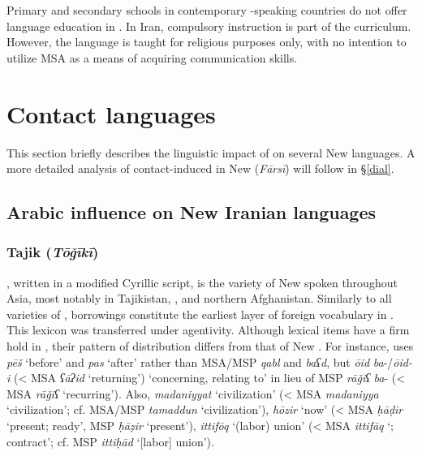\documentclass[output=paper]{langsci/langscibook}
\begin{document}
Primary and secondary schools in contemporary -speaking countries do not offer language education in . In Iran, compulsory   instruction is part of the curriculum. However, the language is taught for religious purposes only, with no intention to utilize MSA as a means of acquiring communication skills.

\section{Contact languages}

This section briefly describes the linguistic impact of   on several New  languages. A more detailed analysis of contact-induced  in New  (\textit{Fārsī}) will follow in §\ref{dial}.

\subsection{Arabic influence on New Iranian languages}

\subsubsection{Tajik (\textit{Tōǧīkī})}

, written in a modified Cyrillic script, is the variety of New  spoken throughout  Asia, most notably in Tajikistan, , and northern Afghanistan. Similarly to all varieties of ,  borrowings constitute the earliest layer of foreign vocabulary in  \citep{Perry2009}. This lexicon was transferred under  agentivity. Although  lexical items have a firm hold in , their pattern of distribution differs from that of New . For instance,  uses \textit{pēš} ‘before’ and \textit{pas} ‘after’ rather than MSA/MSP \textit{qabl} and \textit{baʕd}, but \textit{ōid} \textit{ba}{}-/\textit{ōid-i} (< MSA \textit{ʕāʔid} ‘returning’) ‘concerning, relating to’ in lieu of MSP \textit{rāǧiʕ} \textit{ba}{}- (< MSA \textit{rāǧiʕ} ‘recurring’). Also, \textit{madaniyyat} ‘civilization’ (< MSA \textit{madaniyya} ‘civilization’; cf. MSA/MSP \textit{tamaddun} ‘civilization’), \textit{hōzir} ‘now’ (< MSA \textit{ḥāḍir} ‘present; ready’, MSP \textit{ḥāẓir} ‘present’), \textit{ittifōq} ‘(labor) union’ (< MSA \textit{ittifāq} ‘; contract’; cf.  MSP \textit{ittiḥād} ‘[labor] union’).
\end{document}
